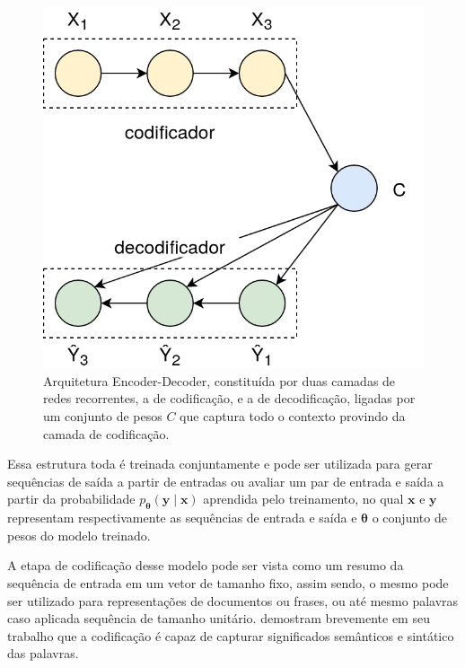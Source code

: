 \begin{figure}
\begin{center} {
    \begin{center}
    \includegraphics[scale=0.30]{images/encoder_decoder.png}
    \caption{Arquitetura Encoder-Decoder, constituída por duas camadas de redes
             recorrentes, a de codificação, e a de decodificação, ligadas por um
             conjunto de pesos $C$ que captura todo o contexto provindo da
             camada de codificação.}
    \label{fig:encoder_decoder}
    \end{center}
}
\end{center}
\end{figure}

Essa estrutura toda é treinada conjuntamente e pode ser utilizada para gerar
sequências de saída a partir de entradas ou avaliar um par de entrada e saída a
partir da probabilidade $p_{\mathbf{\theta}}(\mathbf{y} \mid \mathbf{x})$
aprendida pelo treinamento, no qual $\mathbf{x}$ e $\mathbf{y}$ representam
respectivamente as sequências de entrada e saída e $\mathbf{\theta}$ o conjunto
de pesos do modelo treinado.

A etapa de codificação desse modelo pode ser vista como um resumo da sequência
de entrada em um vetor de tamanho fixo, assim sendo, o mesmo pode ser utilizado
para representações de documentos ou frases, ou até mesmo palavras caso aplicada
sequência de tamanho unitário.
\citet{cho14} demostram brevemente em seu trabalho que a codificação é capaz de
capturar significados semânticos e sintático das palavras.

